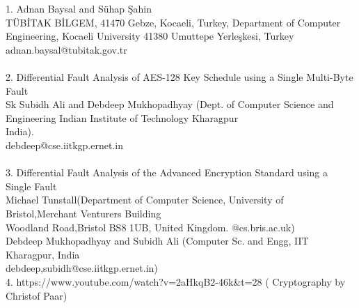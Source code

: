 \section*{\fontsize{25}{29}\selectfont{\textbf References} \\}


1. Adnan Baysal and Sühap Şahin \\ TÜBİTAK BİLGEM, 41470 Gebze, Kocaeli, Turkey,
Department of Computer Engineering, Kocaeli University 41380 Umuttepe Yerleşkesi, Turkey
\\ {\color{blue}adnan.baysal@tubitak.gov.tr}\\ \\
2. Differential Fault Analysis of AES-128 Key Schedule using a Single Multi-Byte Fault \\
Sk Subidh Ali and Debdeep Mukhopadhyay (Dept. of Computer Science and Engineering
Indian Institute of Technology Kharagpur \\ India). \\ {\color{blue}debdeep@cse.iitkgp.ernet.in} \\ \\
3. Differential Fault Analysis of the Advanced Encryption Standard using a Single Fault \\ 
Michael Tunstall(Department of Computer Science, University of Bristol,Merchant Venturers Building \\ Woodland Road,Bristol BS8 1UB, United Kingdom. {\color{blue}@cs.bris.ac.uk)} \\ Debdeep Mukhopadhyay and Subidh Ali (Computer Sc. and Engg, IIT Kharagpur, India \\ {\color{blue}debdeep,subidh@cse.iitkgp.ernet.in)} \\
4. {\color{blue}https://www.youtube.com/watch?v=2aHkqB2-46k&t=28 }( Cryptography by Christof Paar)